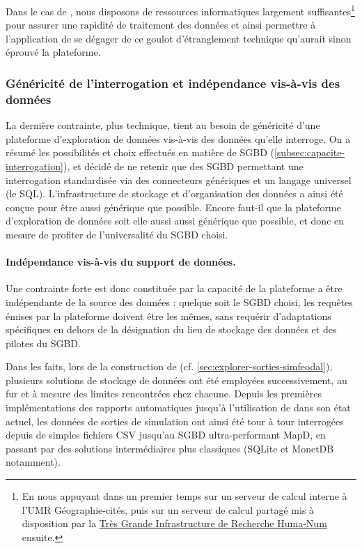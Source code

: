 Dans le cas de \simedb{}, nous disposons de ressources informatiques largement suffisantes\footnote{
	En nous appuyant dans un premier temps sur un serveur de calcul interne à l'UMR Géographie-cités, puis sur un serveur de calcul partagé mis à disposition par la \href{https://www.huma-num.fr/}{\og Très Grande Infrastructure de Recherche\fg{} Huma-Num} ensuite.
} pour assurer une rapidité de traitement des données et ainsi permettre à l'application de se dégager de ce \og goulot d'étranglement\fg{} technique qu'aurait sinon éprouvé la plateforme.

\subsubsection{Généricité de l'interrogation et indépendance vis-à-vis des données}

La dernière contrainte, plus technique, tient au besoin de généricité d'une plateforme d'exploration de données vis-à-vis des données qu'elle interroge.
On a résumé les possibilités et choix effectués en matière de SGBD (\cref{subsec:capacite-interrogation}), et décidé de ne retenir que des SGBD permettant une interrogation standardisée via des connecteurs génériques et un langage universel (le SQL).
L'infrastructure de stockage et d'organisation des données a ainsi été conçue pour être aussi générique que possible.
Encore faut-il que la plateforme d'exploration de données soit elle aussi aussi générique que possible, et donc en mesure de profiter de l'universalité du SGBD choisi.

\paragraph{Indépendance vis-à-vis du support de données.}
Une contrainte forte est donc constituée par la capacité de la plateforme a être indépendante de la source des données : quelque soit le SGBD choisi, les requêtes émises par la plateforme doivent être les mêmes, sans requérir d'adaptations spécifiques en dehors de la désignation du lieu de stockage des données	et des pilotes du SGBD.

Dans les faits, lors de la construction de \simedb{} (cf. \cref{sec:explorer-sorties-simfeodal}), plusieurs solutions de stockage de données ont été employées successivement, au fur et à mesure des limites rencontrées chez chacune.
Depuis les premières implémentations des rapports automatiques jusqu'à l'utilisation de \simedb{} dans son état actuel, les données de sorties de simulation ont ainsi été tour à tour interrogées depuis de simples fichiers CSV jusqu'au SGBD ultra-performant MapD, en passant par des solutions intermédiaires plus classiques (SQLite et MonetDB notamment).

